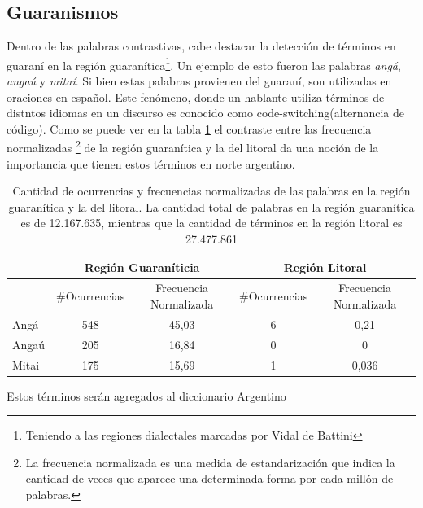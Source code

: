 
\subsection{Guaranismos}
\label{sub:guaranismos}

Dentro de las palabras contrastivas, cabe destacar la detección de términos en guaraní en la región 
guaranítica\footnote{Teniendo a las regiones dialectales marcadas por Vidal de Battini}.
Un ejemplo de esto fueron las palabras \textit{angá}, \textit{angaú} y \textit{mitaí}.  Si bien estas palabras provienen del guaraní, son utilizadas en oraciones en español.
Este fenómeno, donde un hablante utiliza términos de distntos idiomas en un discurso es conocido como code-switching(alternancia de código).
Como se puede ver en la tabla \ref{tab:guaranismos} el contraste entre las frecuencia normalizadas \footnote{La frecuencia normalizada es una medida de estandarización que indica la cantidad de veces que aparece una determinada forma por cada millón de palabras.} de la región guaranítica y la del litoral da una noción de la importancia que tienen estos términos en norte argentino. 

\begin{table}[]
\centering
\label{tab:guaranismos}
\begin{tabular}{|l|cc|cc|}
\hline
 & \multicolumn{2}{c}{Región Guaraníticia} & \multicolumn{2}{c}{Región Litoral} \\ \hline
      & \#Ocurrencias & Frecuencia Normalizada & \#Ocurrencias & Frecuencia Normalizada \\
Angá  & 548              & 45,03       & 6             & 0,21                  \\
Angaú & 205               & 16,84   & 0               & 0                     \\
Mitai & 175              & 15,69      & 1              & 0,036    \\ \hline              
\end{tabular}
\caption{Cantidad de ocurrencias y frecuencias normalizadas de las palabras en la región guaranítica y la del litoral. La cantidad total de palabras en la región guaranítica es de 12.167.635, mientras que la cantidad de términos en la región litoral es 27.477.861 }

\end{table}

Estos términos serán agregados al diccionario Argentino